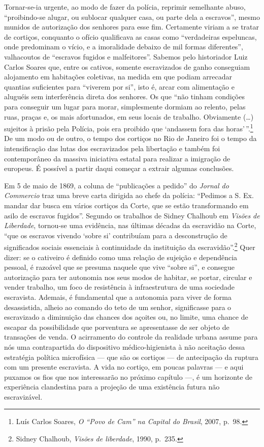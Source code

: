 Tornar-se-ia urgente, ao modo de fazer da polícia, reprimir semelhante
abuso, ``proibindo-se alugar, ou sublocar qualquer casa, ou parte dela a
escravos'', mesmo munidos de autorização dos senhores para esse fim.
Certamente viriam a se tratar de cortiços, conquanto o ofício
qualificava as casas como ``verdadeiras espeluncas, onde predominam o
vício, e a imoralidade debaixo de mil formas diferentes'', valhacoutos
de ``escravos fugidos e malfeitores''. Sabemos pelo historiador Luiz
Carlos Soares que, entre os cativos, somente escravizados de ganho
conseguiam alojamento em habitações coletivas, na medida em que podiam
arrecadar quantias suficientes para ``viverem por si'', isto é, arcar
com alimentação e aluguéis sem interferência direta dos senhores. Os que
``não tinham condições para conseguir um lugar para morar, simplesmente
dormiam ao relento, pelas ruas, praças e, os mais afortunados, em seus
locais de trabalho. Obviamente (\ldots{}) sujeitos à prisão pela
Polícia, pois era proibido que `andassem fora das horas'\,''.\footnote{Luís
  Carlos Soares, \textit{O ``Povo de Cam'' na Capital do Brasil}, 2007,
  p.~98.} De um modo ou de outro, o tempo dos cortiços no Rio de Janeiro
foi o tempo da intensificação das lutas dos escravizados pela libertação
e também foi contemporâneo da massiva iniciativa estatal para realizar a
imigração de europeus. É possível a partir daqui começar a extrair
algumas conclusões.

Em 5 de maio de 1869, a coluna de ``publicações a pedido'' do
\textit{Jornal do Commercio} traz uma breve carta dirigida ao chefe da
polícia: ``Pedimos a S. Ex. mandar dar busca em vários cortiços da
Corte, que se estão transformando em asilo de escravos fugidos''.
Segundo os trabalhos de Sidney Chalhoub em \textit{Visões de Liberdade},
tornou-se uma evidência, nas últimas décadas da escravidão na Corte,
``que os escravos vivendo `sobre si' contribuíam para a desconstrução de
significados sociais essenciais à continuidade da instituição da
escravidão''.\footnote{Sidney Chalhoub, \textit{Visões de liberdade},
  1990, p.~235.} Quer dizer: se o cativeiro é definido como uma relação
de sujeição e dependência pessoal, é razoável que se presuma naquele que
vive ``sobre si'', e consegue autorização para ter autonomia nos seus
modos de habitar, se portar, circular e vender trabalho, um foco de
resistência à infraestrutura de uma sociedade escravista. Ademais, é
fundamental que a autonomia para viver de forma desassistida, alheio ao
comando do teto de um senhor, significasse para o escravizado a
diminuição das chances dos açoites ou, no limite, uma chance de escapar
da possibilidade que porventura se apresentasse de ser objeto de
transações de venda. O acirramento do controle da realidade urbana
assume para nós uma contrapartida do dispositivo médico-higienista à não
aceitação dessa estratégia política microfísica --- que são os cortiços
--- de antecipação da ruptura com um presente escravista. A vida no
cortiço, em poucas palavras --- e aqui puxamos os fios que nos
interessarão no próximo capítulo ---, é um horizonte de experiência
clandestina para a projeção de uma existência futura não escravizável.

